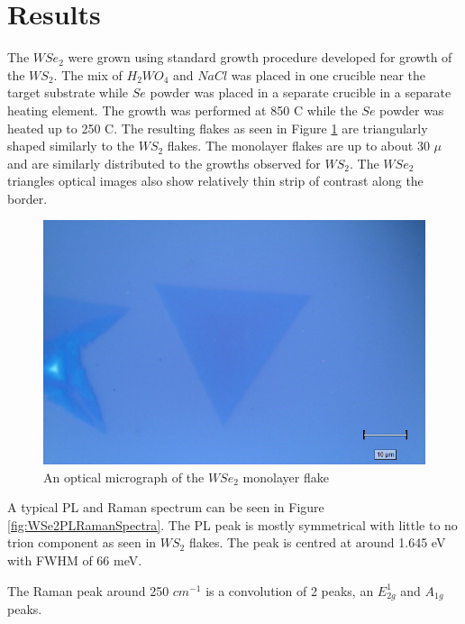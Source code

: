 \section{Results}

The $WSe_2$ were grown using standard growth procedure developed for growth of the $WS_2$. The mix of $H_2WO_4$ and $NaCl$ was placed in one crucible near the target substrate while $Se$ powder was placed in a separate crucible in a separate heating element. The growth was performed at 850 {\degree}C while the $Se$ powder was heated up to 250 {\degree}C. The resulting flakes as seen in Figure \ref{fig:WSe2OMMap} are triangularly shaped similarly to the $WS_2$ flakes. The monolayer flakes are up to about 30 $\mu$ and are similarly distributed to the growths observed for $WS_2$. The $WSe_2$ triangles optical images also show relatively thin strip of contrast along the border.

\begin{figure}[!h]
	\begin{center}
		\includegraphics[scale=0.5]{WSe2/OMMap.png}
		\caption{An optical micrograph of the $WSe_2$ monolayer flake}
		\label{fig:WSe2OMMap}
	\end{center}
\end{figure}
	
A typical PL and Raman spectrum can be seen in Figure \ref{fig:WSe2PLRamanSpectra}. The PL peak is mostly symmetrical with little to no trion component as seen in $WS_2$ flakes. The peak is centred at around 1.645 eV with FWHM of 66 meV.  

The Raman peak around 250 $cm^{-1}$ is a convolution of 2 peaks, an $E^1_{2g}$ and $A_{1g}$ peaks.  
	
